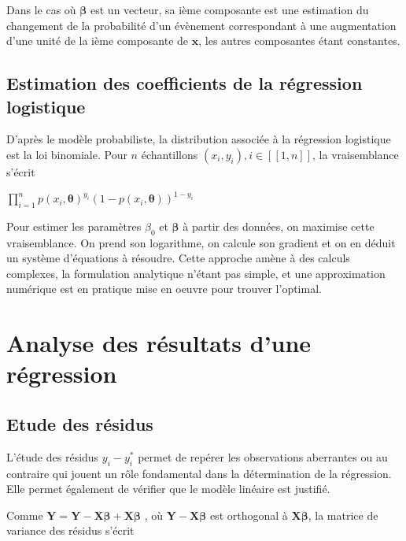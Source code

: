 \documentclass[letterpaper,10pt,english]{jupyterBook}
\begin{document}
\sphinxAtStartPar
Dans le cas où \(\boldsymbol\beta\) est un vecteur, sa ième composante est une estimation du changement de la probabilité d’un évènement correspondant à une augmentation d’une unité de la ième composante de \(\mathbf x\), les autres composantes étant constantes.


\subsection{Estimation des coefficients de la régression logistique}
\label{\detokenize{regression:estimation-des-coefficients-de-la-regression-logistique}}
\sphinxAtStartPar
D’après le modèle probabiliste, la distribution associée à la régression logistique est la loi binomiale. Pour \(n\) échantillons \((x_i,y_i),i\in[\![1,n]\!]\), la vraisemblance s’écrit

\sphinxAtStartPar
\(\displaystyle\prod_{i=1}^n p(x_i,\boldsymbol\theta)^{y_i}(1-p(x_i,\boldsymbol\theta))^{1-y_i}\)

\sphinxAtStartPar
Pour estimer les paramètres \(\beta_0\) et \(\boldsymbol\beta\) à partir des données, on maximise cette vraisemblance. On prend son logarithme, on calcule son gradient et on en déduit un système d’équations à résoudre. Cette approche amène à des calculs complexes, la formulation analytique n’étant pas simple, et une approximation numérique est en pratique mise en oeuvre pour trouver l’optimal.


\section{Analyse des résultats d’une régression}
\label{\detokenize{regression:analyse-des-resultats-d-une-regression}}

\subsection{Etude des résidus}
\label{\detokenize{regression:etude-des-residus}}
\sphinxAtStartPar
L’étude des résidus \( y_i- y^*_i\) permet de repérer les observations aberrantes ou au contraire qui jouent un rôle fondamental dans la détermination de la régression. Elle permet également de vérifier que  le modèle linéaire est justifié.

\sphinxAtStartPar
Comme \(\mathbf Y = \mathbf Y -\mathbf X\boldsymbol \beta +\mathbf X\boldsymbol \beta\) , où \(\mathbf Y-\mathbf X\boldsymbol \beta \) est orthogonal à \(\mathbf X\boldsymbol \beta\), la matrice de variance des résidus s’écrit
\end{document}
